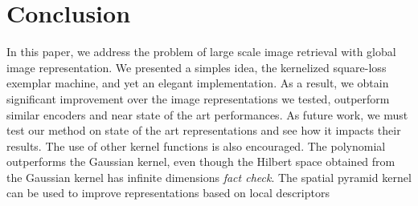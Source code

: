 \section{Conclusion}
\label{conclusion}
In this paper, we address the problem of large scale image retrieval with global image representation. 
We presented a simples idea, the kernelized square-loss exemplar machine, and yet an elegant implementation. 
As a result, we obtain significant improvement over the image representations we tested, outperform similar encoders and near state of the art performances.
As future work, we must test our method on state of the art representations and see how it impacts their results.
The use of other kernel functions is also encouraged. The polynomial outperforms the Gaussian kernel, even though the Hilbert space obtained from the Gaussian kernel has infinite dimensions \emph{\color{red} fact check}. 
The spatial pyramid kernel can be used to improve representations based on local descriptors
